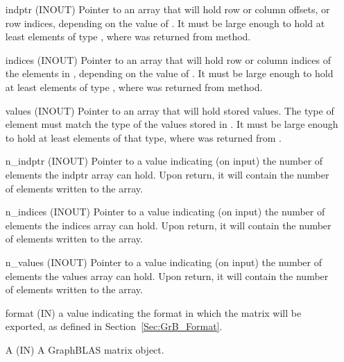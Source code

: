 \begin{itemize}[leftmargin=1.1in]
    \item[{\sf indptr}] ({\sf INOUT}) Pointer to an array that will hold row or 
                        column offsets, or row indices, depending on the value 
                        of . It must be large enough to hold at least 
                         elements of type , where 
                         was returned from 
                         method.

    \item[{\sf indices}] ({\sf INOUT}) Pointer to an array that will hold row or 
                        column indices of the elements in , depending 
                        on the value of .  It must be large enough to 
                        hold at least  elements of type 
                        , where  was returned 
                        from  method.

    \item[{\sf values}] ({\sf INOUT}) Pointer to an array that will hold stored values.  
                        The type of element must match the type of the values stored 
                        in . It must be large enough to hold at least 
                         elements of that type, where  
                        was returned from .

    \item[{\sf n\_indptr}] ({\sf INOUT}) Pointer to a value indicating (on input)
                        the number of elements the {\sf indptr} array can hold.
                        Upon return, it will contain the number of elements written
                        to the array.

    \item[{\sf n\_indices}] ({\sf INOUT}) Pointer to a value indicating (on input)
                        the number of elements the {\sf indices} array can hold. 
                        Upon return, it will contain the number of elements written 
                        to the array.

    \item[{\sf n\_values}] ({\sf INOUT}) Pointer to a value indicating (on input)
                        the number of elements the {\sf values} array can hold. 
                        Upon return, it will contain the number of elements written
                        to the array.

    \item[{\sf format}] ({\sf IN}) a value indicating the format in which the matrix
                        will be exported, as defined in Section~\ref{Sec:GrB_Format}.

    \item[{\sf A}]      ({\sf IN}) A GraphBLAS matrix object.
\end{itemize}

